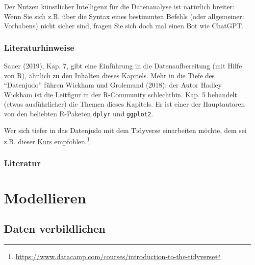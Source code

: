 \documentclass[
  a4paper,
  DIV=11]{scrreprt}
\theoremstyle{definition}
\theoremstyle{definition}
\theoremstyle{definition}
\theoremstyle{remark}
\begin{document}
\begin{tcolorbox}[enhanced jigsaw, leftrule=.75mm, opacitybacktitle=0.6, colback=white, colframe=quarto-callout-note-color-frame, coltitle=black, colbacktitle=quarto-callout-note-color!10!white, opacityback=0, left=2mm, breakable, titlerule=0mm, toptitle=1mm, bottomtitle=1mm, rightrule=.15mm, title=\textcolor{quarto-callout-note-color}{\faInfo}\hspace{0.5em}{Hinweis}, arc=.35mm, bottomrule=.15mm, toprule=.15mm]

Der Nutzen künstlicher Intelligenz für die Datenanalyse ist natürlich
breiter: Wenn Sie sich z.B. über die Syntax eines bestimmten Befehls
(oder allgemeiner: Vorhabens) nicht sicher sind, fragen Sie sich doch
mal einen Bot wie ChatGPT.

\end{tcolorbox}

\section{Literaturhinweise}\label{literaturhinweise-2}

Sauer (2019), Kap. 7, gibt eine Einführung in die Datenaufbereitung (mit
Hilfe von R), ähnlich zu den Inhalten dieses Kapitels. Mehr in die Tiefe
des ``Datenjudo'' führen Wickham und Grolemund (2018); der Autor Hadley
Wickham ist die Leitfigur in der R-Community schlechthin. Kap. 5
behandelt (etwas ausführlicher) die Themen dieses Kapitels. Er ist einer
der Hauptautoren von den beliebten R-Paketen \texttt{dplyr} und
\texttt{ggplot2}.

Wer sich tiefer in das Datenjudo mit dem Tidyverse einarbeiten möchte,
dem sei z.B. dieser
\href{https://www.datacamp.com/courses/introduction-to-the-tidyverse}{Kurs}
empfohlen.\footnote{\url{https://www.datacamp.com/courses/introduction-to-the-tidyverse}}

\section{Literatur}\label{literatur-2}

\part{Modellieren}

\chapter{Daten verbildlichen}\label{daten-verbildlichen}
\end{document}
